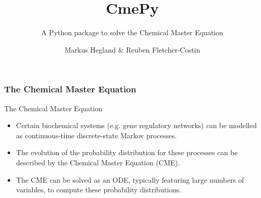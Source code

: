 \documentclass[hyperref={colorlinks=true}]{beamer}
\title{CmePy}
\subtitle{A Python package to solve the Chemical Master Equation}
\author{Markus Hegland \& Reuben Fletcher-Costin}
\begin{document}
\begin{frame}
\titlepage
\end{frame}

\begin{frame}
\frametitle{The Chemical Master Equation}
\begin{block}{The Chemical Master Equation}
\begin{itemize}
\item Certain biochemical systems (e.g. gene regulatory networks) can be
modelled as continuous-time discrete-state Markov processes.
\item The evolution of the probability distribution for these processes can be
described by the Chemical Master Equation (CME).
\item The CME can be solved as an ODE, typically featuring large numbers of
variables, to compute these probability distributions.
\end{itemize}
\end{block}
\end{frame}
\end{document}
